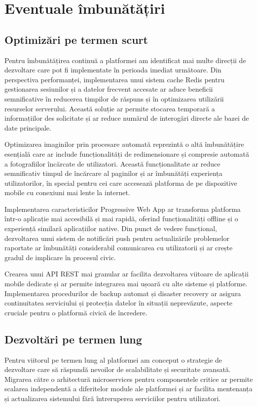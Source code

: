 \documentclass[12pt,a4paper]{report}
\begin{document}
\section{Eventuale îmbunătățiri}
\subsection{Optimizări pe termen scurt}
Pentru îmbunătățirea continuă a platformei am identificat mai multe direcții de dezvoltare care pot fi implementate în perioada imediat următoare. Din perspectiva performanței, implementarea unui sistem cache Redis pentru gestionarea sesiunilor și a datelor frecvent accesate ar aduce beneficii semnificative în reducerea timpilor de răspuns și în optimizarea utilizării resurselor serverului. Această soluție ar permite stocarea temporară a informațiilor des solicitate și ar reduce numărul de interogări directe ale bazei de date principale.

Optimizarea imaginilor prin procesare automată reprezintă o altă îmbunătățire esențială care ar include funcționalități de redimensionare și compresie automată a fotografiilor încărcate de utilizatori. Această funcționalitate ar reduce semnificativ timpul de încărcare al paginilor și ar îmbunătăți experiența utilizatorilor, în special pentru cei care accesează platforma de pe dispozitive mobile cu conexiuni mai lente la internet.

Implementarea caracteristicilor Progressive Web App ar transforma platforma într-o aplicație mai accesibilă și mai rapidă, oferind funcționalități offline și o experiență similară aplicațiilor native. Din punct de vedere funcțional, dezvoltarea unui sistem de notificări push pentru actualizările problemelor raportate ar îmbunătăți considerabil comunicarea cu utilizatorii și ar crește gradul de implicare în procesul civic.

Crearea unui API REST mai granular ar facilita dezvoltarea viitoare de aplicații mobile dedicate și ar permite integrarea mai ușoară cu alte sisteme și platforme. Implementarea procedurilor de backup automat și disaster recovery ar asigura continuitatea serviciului și protecția datelor în situații neprevăzute, aspecte cruciale pentru o platformă civică de încredere.
\subsection{Dezvoltări pe termen lung}
Pentru viitorul pe termen lung al platformei am conceput o strategie de dezvoltare care să răspundă nevoilor de scalabilitate și securitate avansată. Migrarea către o arhitectură microservices pentru componentele critice ar permite scalarea independentă a diferitelor module ale platformei și ar facilita mentenanța și actualizarea sistemului fără întreruperea serviciilor pentru utilizatori.
\end{document}
